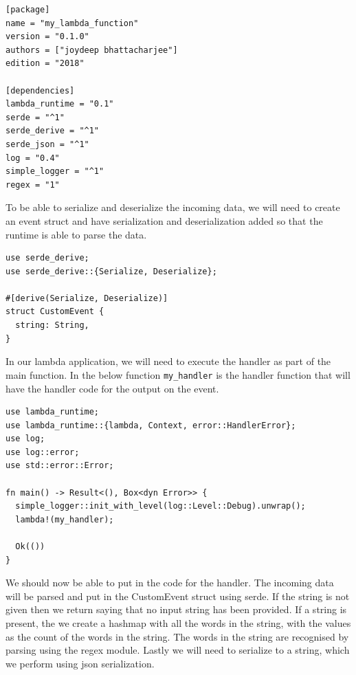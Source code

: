 \documentclass{book}
\begin{document}
\begin{lstlisting}[caption={chapter8/my\_lambda\_function/Cargo.toml}, basicstyle=\small]
[package]
name = "my_lambda_function"
version = "0.1.0"
authors = ["joydeep bhattacharjee"]
edition = "2018"

[dependencies]
lambda_runtime = "0.1"
serde = "^1"
serde_derive = "^1"
serde_json = "^1"
log = "0.4"
simple_logger = "^1"
regex = "1"
\end{lstlisting}

To be able to serialize and deserialize the incoming data, we will need to create an event struct and have serialization and deserialization added so that the runtime is able to parse the data.

\begin{lstlisting}[caption={chapter8/my\_lambda\_function/src/main.rs}, basicstyle=\small]
use serde_derive;
use serde_derive::{Serialize, Deserialize};

#[derive(Serialize, Deserialize)]
struct CustomEvent {
  string: String,
}
\end{lstlisting}

In our lambda application, we will need to execute the handler as part of the main function. In the below function \lstinline{my_handler} is the handler function that will have the handler code for the output on the event.

\begin{lstlisting}[caption={chapter8/my\_lambda\_function/src/main.rs}, basicstyle=\small]
use lambda_runtime;
use lambda_runtime::{lambda, Context, error::HandlerError};
use log;
use log::error;
use std::error::Error;

fn main() -> Result<(), Box<dyn Error>> {
  simple_logger::init_with_level(log::Level::Debug).unwrap();
  lambda!(my_handler);

  Ok(())
}
\end{lstlisting}

We should now be able to put in the code for the handler. The incoming data will be parsed and put in the CustomEvent struct using serde. If the string is not given then we return saying that no input string has been provided. If a string is present, the we create a hashmap with all the words in the string, with the values as the count of the words in the string. The words in the string are recognised by parsing using the regex module. Lastly we will need to serialize to a string, which we perform using json serialization.
\end{document}
